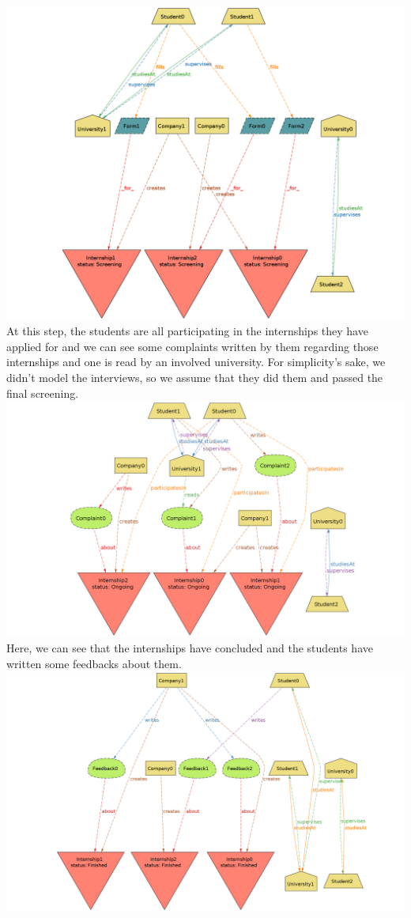 \documentclass[11pt,twoside]{article}
\begin{document}
\includegraphics[width=\textwidth]{Images/Scene_step1}
\newpage
At this step, the students are all participating in the internships they have applied for and we can see some complaints written by them regarding those internships and one is read by an involved university. For simplicity's sake, we didn't model the interviews, so we assume that they did them and passed the final screening. \\
\includegraphics[width=\textwidth]{Images/Scene_step2}
Here, we can see that the internships have concluded and the students have written some feedbacks about them. \\
\includegraphics[width=\textwidth]{Images/Scene_step3}
\end{document}
